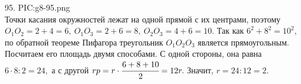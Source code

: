 95. {{PIC:g8-95.png}}\\
Точки касания окружностей лежат на одной прямой с их центрами, поэтому $O_1O_2=2+4=6,\ O_1O_3=2+6=8,\ O_2O_3=4+6=10.$ Так как $6^2+8^2=10^2,$ по обратной теореме Пифагора треугольник $O_1O_2O_3$ является прямоугольным. Посчитаем его площадь двумя способами. С одной стороны, она равна $6\cdot8:2=24,$ а с другой $rp=r\cdot\cfrac{6+8+10}{2}=12r.$ Значит, $r=24:12=2.$\newpage\noindent
